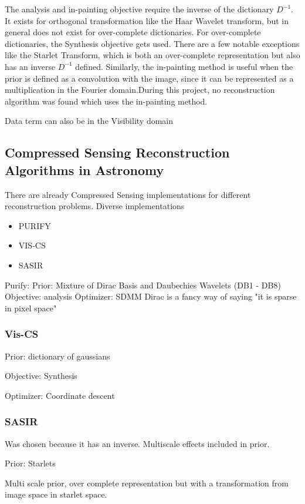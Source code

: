 The analysis and in-painting objective require the inverse of the dictionary $D^{-1}$. It exists for orthogonal transformation like the Haar Wavelet transform, but in general does not exist for over-complete dictionaries. For over-complete dictionaries, the Synthesis objective gets used. There are a few notable exceptions like the Starlet Transform, which is both an over-complete representation but also has an inverse $D^{-1}$ defined. Similarly, the in-painting method is useful when the prior is defined as a convolution with the image, since it can be represented as a multiplication in the Fourier domain.During this project, no reconstruction algorithm was found which uses the in-painting method.

Data term can also be in the Visibility domain


\subsection{Compressed Sensing Reconstruction Algorithms in Astronomy}
There are already Compressed Sensing implementations for different reconstruction problems. Diverse implementations
\begin{itemize}
	\item PURIFY \cite{purify}
	\item VIS-CS \cite{visCS}
	\item SASIR \cite{girard2015sparse}
\end{itemize}

Purify:
Prior: Mixture of Dirac Basis and Daubechies Wavelets (DB1 - DB8)
Objective: analysis
Optimizer: SDMM
Dirac is a fancy way of saying "it is sparse in pixel space"


\subsubsection{Vis-CS}
Prior: dictionary of gaussians

Objective: Synthesis

Optimizer: Coordinate descent


\subsubsection{SASIR}
Was chosen because it has an inverse. Multiscale effects included in prior.


Prior: Starlets

Multi scale prior,  over complete representation but with a transformation from image space in starlet space.


